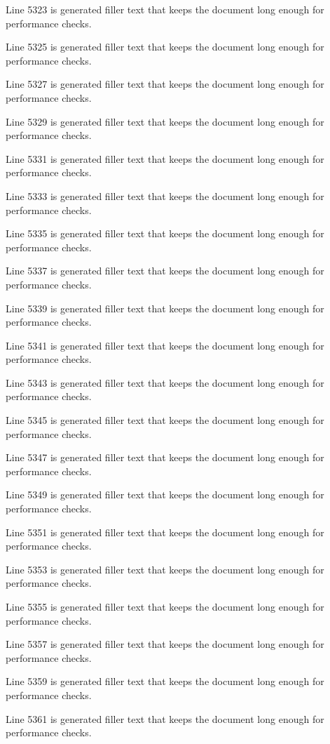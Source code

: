 Line 5323 is generated filler text that keeps the document long enough for performance checks.

Line 5325 is generated filler text that keeps the document long enough for performance checks.

Line 5327 is generated filler text that keeps the document long enough for performance checks.

Line 5329 is generated filler text that keeps the document long enough for performance checks.

Line 5331 is generated filler text that keeps the document long enough for performance checks.

Line 5333 is generated filler text that keeps the document long enough for performance checks.

Line 5335 is generated filler text that keeps the document long enough for performance checks.

Line 5337 is generated filler text that keeps the document long enough for performance checks.

Line 5339 is generated filler text that keeps the document long enough for performance checks.

Line 5341 is generated filler text that keeps the document long enough for performance checks.

Line 5343 is generated filler text that keeps the document long enough for performance checks.

Line 5345 is generated filler text that keeps the document long enough for performance checks.

Line 5347 is generated filler text that keeps the document long enough for performance checks.

Line 5349 is generated filler text that keeps the document long enough for performance checks.

Line 5351 is generated filler text that keeps the document long enough for performance checks.

Line 5353 is generated filler text that keeps the document long enough for performance checks.

Line 5355 is generated filler text that keeps the document long enough for performance checks.

Line 5357 is generated filler text that keeps the document long enough for performance checks.

Line 5359 is generated filler text that keeps the document long enough for performance checks.

Line 5361 is generated filler text that keeps the document long enough for performance checks.

